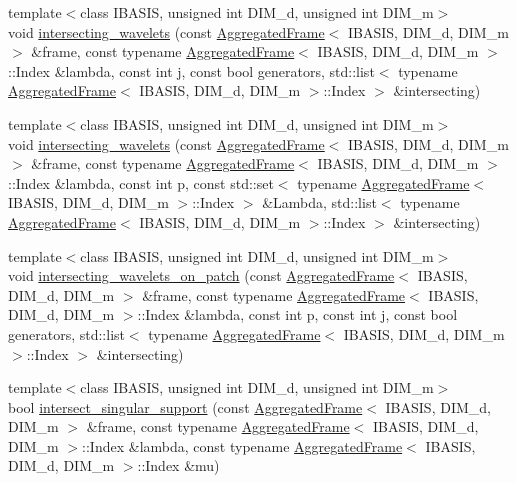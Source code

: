 \begin{CompactItemize}
\item 
{\footnotesize template$<$class IBASIS, unsigned int DIM\_\-d, unsigned int DIM\_\-m$>$ }\\void \hyperlink{namespaceFrameTL_1823fb7effb657b388e652efbef319b3}{intersecting\_\-wavelets} (const \hyperlink{classFrameTL_1_1AggregatedFrame}{AggregatedFrame}$<$ IBASIS, DIM\_\-d, DIM\_\-m $>$ \&frame, const typename \hyperlink{classFrameTL_1_1AggregatedFrame}{AggregatedFrame}$<$ IBASIS, DIM\_\-d, DIM\_\-m $>$::Index \&lambda, const int j, const bool generators, std::list$<$ typename \hyperlink{classFrameTL_1_1AggregatedFrame}{AggregatedFrame}$<$ IBASIS, DIM\_\-d, DIM\_\-m $>$::Index $>$ \&intersecting)
\item 
{\footnotesize template$<$class IBASIS, unsigned int DIM\_\-d, unsigned int DIM\_\-m$>$ }\\void \hyperlink{namespaceFrameTL_0005c53dfff8661290582ea77b5ebcff}{intersecting\_\-wavelets} (const \hyperlink{classFrameTL_1_1AggregatedFrame}{AggregatedFrame}$<$ IBASIS, DIM\_\-d, DIM\_\-m $>$ \&frame, const typename \hyperlink{classFrameTL_1_1AggregatedFrame}{AggregatedFrame}$<$ IBASIS, DIM\_\-d, DIM\_\-m $>$::Index \&lambda, const int p, const std::set$<$ typename \hyperlink{classFrameTL_1_1AggregatedFrame}{AggregatedFrame}$<$ IBASIS, DIM\_\-d, DIM\_\-m $>$::Index $>$ \&Lambda, std::list$<$ typename \hyperlink{classFrameTL_1_1AggregatedFrame}{AggregatedFrame}$<$ IBASIS, DIM\_\-d, DIM\_\-m $>$::Index $>$ \&intersecting)
\item 
{\footnotesize template$<$class IBASIS, unsigned int DIM\_\-d, unsigned int DIM\_\-m$>$ }\\void \hyperlink{namespaceFrameTL_e57f8b33a1d5167ca7a23c7762e9ad1a}{intersecting\_\-wavelets\_\-on\_\-patch} (const \hyperlink{classFrameTL_1_1AggregatedFrame}{AggregatedFrame}$<$ IBASIS, DIM\_\-d, DIM\_\-m $>$ \&frame, const typename \hyperlink{classFrameTL_1_1AggregatedFrame}{AggregatedFrame}$<$ IBASIS, DIM\_\-d, DIM\_\-m $>$::Index \&lambda, const int p, const int j, const bool generators, std::list$<$ typename \hyperlink{classFrameTL_1_1AggregatedFrame}{AggregatedFrame}$<$ IBASIS, DIM\_\-d, DIM\_\-m $>$::Index $>$ \&intersecting)
\item 
{\footnotesize template$<$class IBASIS, unsigned int DIM\_\-d, unsigned int DIM\_\-m$>$ }\\bool \hyperlink{namespaceFrameTL_27f6cca23b933ff76a0597a62f5dd870}{intersect\_\-singular\_\-support} (const \hyperlink{classFrameTL_1_1AggregatedFrame}{AggregatedFrame}$<$ IBASIS, DIM\_\-d, DIM\_\-m $>$ \&frame, const typename \hyperlink{classFrameTL_1_1AggregatedFrame}{AggregatedFrame}$<$ IBASIS, DIM\_\-d, DIM\_\-m $>$::Index \&lambda, const typename \hyperlink{classFrameTL_1_1AggregatedFrame}{AggregatedFrame}$<$ IBASIS, DIM\_\-d, DIM\_\-m $>$::Index \&mu)

\end{CompactItemize}
